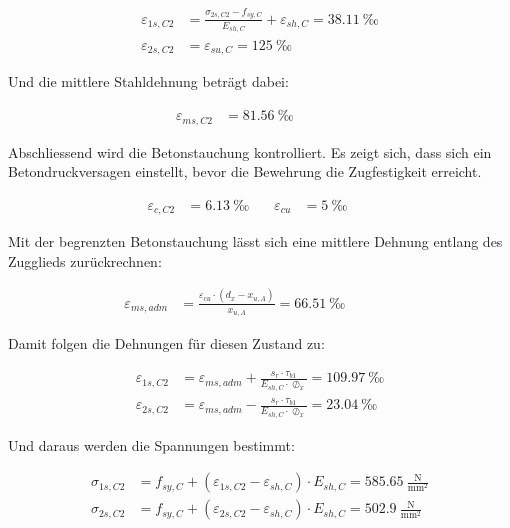\documentclass[
  11pt,
  letterpaper,
]{scrreprt}
\begin{document}
\[
\begin{aligned}
\varepsilon_{1 s , C2}& = \frac{\sigma_{2 s , C2} - f_{sy , C}}{E_{sh , C}} + \varepsilon_{sh , C} = 38.11 \ \mathrm{‰} \\ 
\varepsilon_{2 s , C2}& = \varepsilon_{su , C} = 125 \ \mathrm{‰} \end{aligned}
\]

Und die mittlere Stahldehnung beträgt dabei:

\[
\begin{aligned}
\varepsilon_{m s , C2}& = 81.56 \ \mathrm{‰} \quad &  \quad &  
 \end{aligned}
\]

Abschliessend wird die Betonstauchung kontrolliert. Es zeigt sich, dass
sich ein Betondruckversagen einstellt, bevor die Bewehrung die
Zugfestigkeit erreicht.

\[
\begin{aligned}
\varepsilon_{c , C2}& = 6.13 \ \mathrm{‰} \quad & \varepsilon_{cu}& = 5 \ \mathrm{‰} \quad &  
 \end{aligned}
\]

Mit der begrenzten Betonstauchung lässt sich eine mittlere Dehnung
entlang des Zugglieds zurückrechnen:

\[
\begin{aligned}
\varepsilon_{m s , adm}& = \frac{\varepsilon_{cu} \cdot \left(d_{x} - x_{u , A}\right)}{x_{u , A}} = 66.51 \ \mathrm{‰} \quad &  \quad &  
 \end{aligned}
\]

Damit folgen die Dehnungen für diesen Zustand zu:

\[
\begin{aligned}
\varepsilon_{1 s , C2}& = \varepsilon_{m s , adm} + \frac{s_{r} \cdot \tau_{b1}}{E_{sh , C} \cdot \oslash_{x}} = 109.97 \ \mathrm{‰} \\ 
\varepsilon_{2 s , C2}& = \varepsilon_{m s , adm} - \frac{s_{r} \cdot \tau_{b1}}{E_{sh , C} \cdot \oslash_{x}} = 23.04 \ \mathrm{‰} \end{aligned}
\]

Und daraus werden die Spannungen bestimmt:

\[
\begin{aligned}
\sigma_{1 s , C2}& = f_{sy , C} + \left(\varepsilon_{1 s , C2} - \varepsilon_{sh , C}\right) \cdot E_{sh , C} = 585.65 \ \frac{\mathrm{N}}{\mathrm{mm}^{2}} \\ 
\sigma_{2 s , C2}& = f_{sy , C} + \left(\varepsilon_{2 s , C2} - \varepsilon_{sh , C}\right) \cdot E_{sh , C} = 502.9 \ \frac{\mathrm{N}}{\mathrm{mm}^{2}} \end{aligned}
\]
\end{document}
